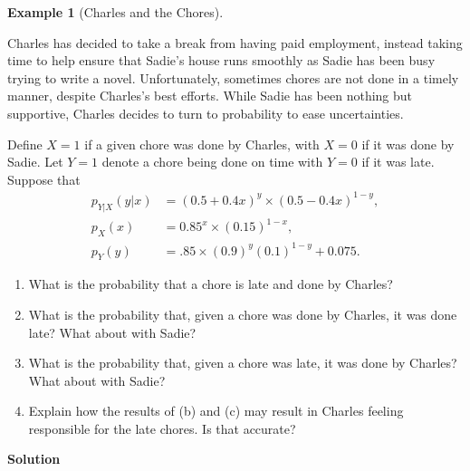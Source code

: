 \documentclass[
  letterpaper,
  DIV=11,
  numbers=noendperiod]{scrreprt}
\providecommand{\tightlist}{%
  \setlength{\itemsep}{0pt}\setlength{\parskip}{0pt}}\usepackage{longtable,booktabs,array}
\theoremstyle{definition}
\theoremstyle{definition}
\newtheorem{example}{Example}[chapter]
\theoremstyle{definition}
\theoremstyle{remark}
\begin{document}
\begin{example}[Charles and the
Chores]\protect\hypertarget{exm-pmg-multiplication-and-bayes}{}\label{exm-pmg-multiplication-and-bayes}

Charles has decided to take a break from having paid employment, instead
taking time to help ensure that Sadie's house runs smoothly as Sadie has
been busy trying to write a novel. Unfortunately, sometimes chores are
not done in a timely manner, despite Charles's best efforts. While Sadie
has been nothing but supportive, Charles decides to turn to probability
to ease uncertainties.

Define \(X=1\) if a given chore was done by Charles, with \(X=0\) if it
was done by Sadie. Let \(Y=1\) denote a chore being done on time with
\(Y = 0\) if it was late. Suppose that \begin{align*}
p_{Y|X}(y|x) &= (0.5 + 0.4x)^{y}\times(0.5 - 0.4x)^{1-y},\\
p_X(x) &= 0.85^{x}\times(0.15)^{1-x},\\
p_Y(y) &= .85\times(0.9)^y(0.1)^{1-y} + 0.075.
\end{align*}

\begin{enumerate}
\def\labelenumi{\alph{enumi}.}
\tightlist
\item
  What is the probability that a chore is late and done by Charles?
\item
  What is the probability that, given a chore was done by Charles, it
  was done late? What about with Sadie?
\item
  What is the probability that, given a chore was late, it was done by
  Charles? What about with Sadie?
\item
  Explain how the results of (b) and (c) may result in Charles feeling
  responsible for the late chores. Is that accurate?
\end{enumerate}

\begin{tcolorbox}[enhanced jigsaw, colback=white, colframe=quarto-callout-color-frame, arc=.35mm, leftrule=.75mm, rightrule=.15mm, opacityback=0, breakable, bottomrule=.15mm, left=2mm, toprule=.15mm]

\vspace{-3mm}\textbf{Solution}\vspace{3mm}


\end{tcolorbox}
\end{example}
\end{document}
